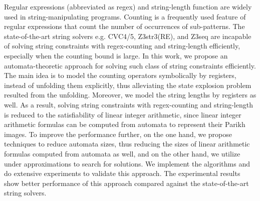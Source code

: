\documentclass{standalone}
\begin{document}
Regular expressions (abbreviated as regex) and string-length function are widely used in string-manipulating programs. 
Counting is a frequently used feature of regular expressions that count the number of occurrences of sub-patterns. The state-of-the-art string solvers e.g. CVC4/5, Z3str3(RE), and Z3seq are incapable of solving string constraints with regex-counting and string-length efficiently, especially when the counting bound is large. In this work, we propose an automata-theoretic approach for solving such class of string constraints efficiently. 
%
The main idea is to model the counting operators symbolically by registers, instead of unfolding them explicitly, thus alleviating the state explosion problem resulted from the unfolding.  
%
Moreover, we model the string lengths by registers as well. As a result, solving string constraints with regex-counting and string-length is reduced to the satisfiability of linear integer arithmetic, since linear integer arithmetic formulas can be computed from automata to represent their Parikh images. 
%
%
To improve the performance further, on the one hand, we propose techniques to reduce automata sizes, thus reducing the sizes of linear arithmetic formulas computed from automata as well, and on the other hand, we utilize under approximations to search for solutions.   
We implement the algorithms and do extensive experiments to validate this approach. The experimental results show better performance of this approach compared against the state-of-the-art string solvers.



\end{document}
